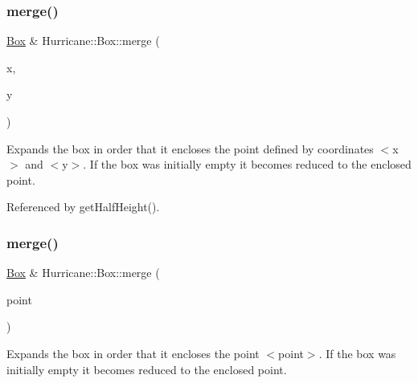 \subsubsection{\texorpdfstring{merge()}{merge()}\hspace{0.1cm}{\footnotesize\ttfamily [1/4]}}
{\footnotesize\ttfamily \hyperlink{classHurricane_1_1Box}{Box} \& Hurricane\+::\+Box\+::merge (\begin{DoxyParamCaption}\item[{const \hyperlink{group__DbUGroup_ga4fbfa3e8c89347af76c9628ea06c4146}{Db\+U\+::\+Unit} \&}]{x,  }\item[{const \hyperlink{group__DbUGroup_ga4fbfa3e8c89347af76c9628ea06c4146}{Db\+U\+::\+Unit} \&}]{y }\end{DoxyParamCaption})}

Expands the box in order that it encloses the point defined by coordinates {\ttfamily $<$x$>$} and {\ttfamily $<$y$>$}. If the box was initially empty it becomes reduced to the enclosed point. 

Referenced by get\+Half\+Height().

\mbox{\label{classHurricane_1_1Box_af1f7dfe8984c2d26fbca78b21358ee2b}} 
\subsubsection{\texorpdfstring{merge()}{merge()}\hspace{0.1cm}{\footnotesize\ttfamily [2/4]}}
{\footnotesize\ttfamily \hyperlink{classHurricane_1_1Box}{Box} \& Hurricane\+::\+Box\+::merge (\begin{DoxyParamCaption}\item[{const \hyperlink{classHurricane_1_1Point}{Point} \&}]{point }\end{DoxyParamCaption})}

Expands the box in order that it encloses the point {\ttfamily $<$point$>$}. If the box was initially empty it becomes reduced to the enclosed point. \mbox{\label{classHurricane_1_1Box_ad97e73e91dd36404eb0dde9d44ff2fd7}} 
